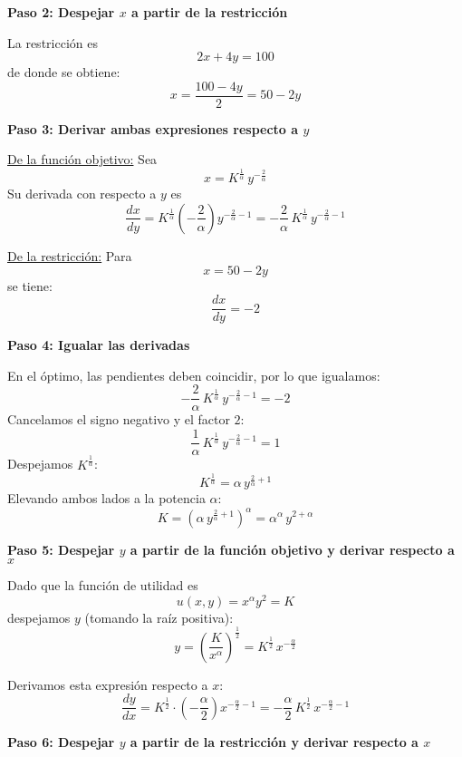 \documentclass{article}
\begin{document}
    \bigskip
    
    \textbf{Paso 2: Despejar \(x\) a partir de la restricción}
    
    La restricción es
    \[
    2x+4y=100
    \]
    de donde se obtiene:
    \[
    x=\frac{100-4y}{2} = 50-2y
    \]
    
    \bigskip
    
    \textbf{Paso 3: Derivar ambas expresiones respecto a \(y\)}
    
    \underline{De la función objetivo:}  
    Sea
    \[
    x=K^{\frac{1}{\alpha}}\,y^{-\frac{2}{\alpha}}
    \]
    Su derivada con respecto a \(y\) es
    \[
    \frac{dx}{dy} = K^{\frac{1}{\alpha}}\left(-\frac{2}{\alpha}\right)y^{-\frac{2}{\alpha}-1} 
    = -\frac{2}{\alpha}\,K^{\frac{1}{\alpha}}\,y^{-\frac{2}{\alpha}-1}
    \]
    
    \underline{De la restricción:}  
    Para
    \[
    x=50-2y
    \]
    se tiene:
    \[
    \frac{dx}{dy}=-2
    \]
    
    \bigskip
    
    \textbf{Paso 4: Igualar las derivadas}
    
    En el óptimo, las pendientes deben coincidir, por lo que igualamos:
    \[
    -\frac{2}{\alpha}\,K^{\frac{1}{\alpha}}\,y^{-\frac{2}{\alpha}-1}=-2
    \]
    Cancelamos el signo negativo y el factor \(2\):
    \[
    \frac{1}{\alpha}\,K^{\frac{1}{\alpha}}\,y^{-\frac{2}{\alpha}-1}=1
    \]
    Despejamos \(K^{\frac{1}{\alpha}}\):
    \[
    K^{\frac{1}{\alpha}} = \alpha\,y^{\frac{2}{\alpha}+1}
    \]
    Elevando ambos lados a la potencia \(\alpha\):
    \[
    K = \left(\alpha\,y^{\frac{2}{\alpha}+1}\right)^\alpha = \alpha^\alpha\, y^{2+\alpha}
    \]
    
    \bigskip
    \textbf{Paso 5: Despejar \(y\) a partir de la función objetivo y derivar respecto a \(x\)}
    
    Dado que la función de utilidad es
    \[
    u(x,y)=x^\alpha y^2=K
    \]
    despejamos \(y\) (tomando la raíz positiva):
    \[
    y = \left(\frac{K}{x^\alpha}\right)^{\frac{1}{2}} = K^{\frac{1}{2}}\, x^{-\frac{\alpha}{2}}
    \]
    
    Derivamos esta expresión respecto a \(x\):
    \[
    \frac{dy}{dx} = K^{\frac{1}{2}} \cdot \left(-\frac{\alpha}{2}\right)x^{-\frac{\alpha}{2}-1}
    = -\frac{\alpha}{2}\,K^{\frac{1}{2}}\, x^{-\frac{\alpha}{2}-1}
    \]
    
    \bigskip
    \textbf{Paso 6: Despejar \(y\) a partir de la restricción y derivar respecto a \(x\)}
    
\end{document}
